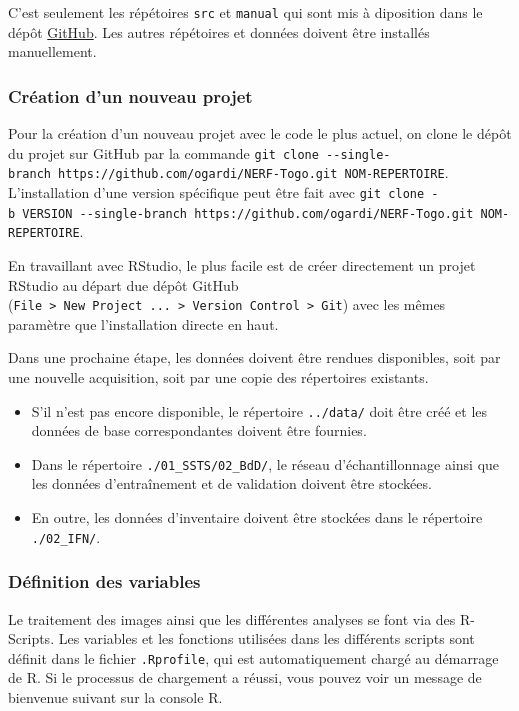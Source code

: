 \documentclass[a4paper, notitlepage, 12pt, krantz2]{krantz}
\providecommand{\tightlist}{%
  \setlength{\itemsep}{0pt}\setlength{\parskip}{0pt}}
\begin{document}
C'est seulement les répétoires \texttt{src} et \texttt{manual} qui sont mis à diposition dans le dépôt \href{https://github.com/ogardi/NERF-Togo}{GitHub}. Les autres répétoires et données doivent être installés manuellement.

\hypertarget{creation-dun-nouveau-projet}{%
\subsubsection{Création d'un nouveau projet}\label{creation-dun-nouveau-projet}}

Pour la création d'un nouveau projet avec le code le plus actuel, on clone le dépôt du projet sur GitHub par la commande \texttt{git\ clone\ -\/-single-branch\ https://github.com/ogardi/NERF-Togo.git\ NOM-REPERTOIRE}. L'installation d'une version spécifique peut être fait avec \texttt{git\ clone\ -b\ VERSION\ -\/-single-branch\ https://github.com/ogardi/NERF-Togo.git\ NOM-REPERTOIRE}.

En travaillant avec RStudio, le plus facile est de créer directement un projet RStudio au départ due dépôt GitHub (\texttt{File\ \textgreater{}\ New\ Project\ ...\ \textgreater{}\ Version\ Control\ \textgreater{}\ Git}) avec les mêmes paramètre que l'installation directe en haut.

Dans une prochaine étape, les données doivent être rendues disponibles, soit par une nouvelle acquisition, soit par une copie des répertoires existants.

\begin{itemize}
\tightlist
\item
  S'il n'est pas encore disponible, le répertoire \texttt{../data/} doit être créé et les données de base correspondantes doivent être fournies.
\item
  Dans le répertoire \texttt{./01\_SSTS/02\_BdD/}, le réseau d'échantillonnage ainsi que les données d'entraînement et de validation doivent être stockées.
\item
  En outre, les données d'inventaire doivent être stockées dans le répertoire \texttt{./02\_IFN/}.
\end{itemize}

\hypertarget{NRF-set-up.R}{%
\subsubsection{Définition des variables}\label{NRF-set-up.R}}

Le traitement des images ainsi que les différentes analyses se font via des R-Scripts. Les variables et les fonctions utilisées dans les différents scripts sont définit dans le fichier \texttt{.Rprofile}, qui est automatiquement chargé au démarrage de R. Si le processus de chargement a réussi, vous pouvez voir un message de bienvenue suivant sur la console R.
\end{document}
